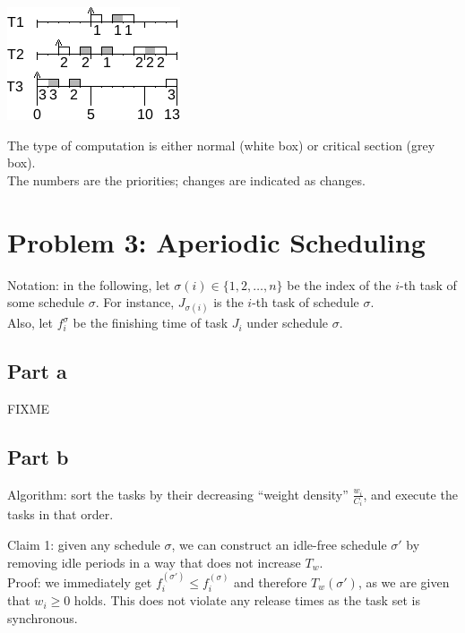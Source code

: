 \documentclass[a4paper,parskip,headheight=38pt]{scrartcl} %
\begin{document}
\includegraphics[width=\textwidth]{p3-schedule}

The type of computation is either normal (white box) or critical
section (grey box).
 \\
The numbers are the priorities; changes are indicated as changes.


\section*{Problem 3: Aperiodic Scheduling}

Notation: in the following, let $\sigma(i) \in \{1, 2, \ldots, n\}$ be
the index of the $i$-th task of some schedule $\sigma$.  For instance,
$J_{\sigma(i)}$ is the $i$-th task of schedule $\sigma$.
 \\
Also, let $f_i^\sigma$ be the finishing time of task $J_i$ under
schedule $\sigma$.

\subsection*{Part a}

FIXME

\subsection*{Part b}

Algorithm: sort the tasks by their decreasing \enquote{weight density}
$\frac{w_i}{C_i}$, and execute the tasks in that order.

Claim 1: given any schedule $\sigma$, we can construct an idle-free
schedule $\sigma'$ by removing idle periods in a way that does not
increase $T_w$.
 \\
Proof: we immediately get $f_i^(\sigma') \leq f_i^(\sigma)$ and
therefore $T_w(\sigma')$, as we are given that $w_i \geq 0$ holds.
This does not violate any release times as the task set is synchronous.
\end{document}

